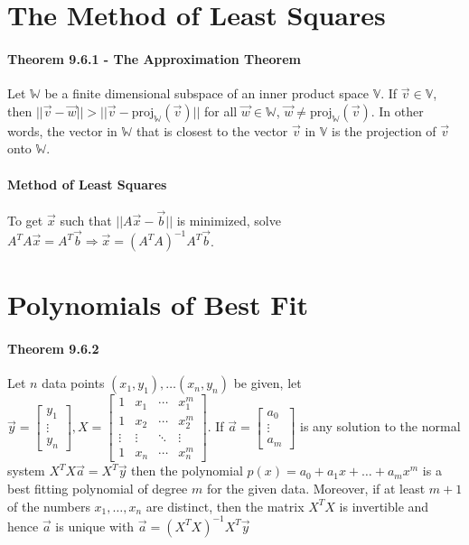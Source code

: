 \documentclass[10pt,letter]{article}
\begin{document}
\section*{The Method of Least Squares}
\paragraph{Theorem 9.6.1 - The Approximation Theorem}
Let $\mathbb{W}$ be a finite dimensional subspace of an inner product space $\mathbb{V}$. If $\vec{v}\in\mathbb{V}$, then $||\vec{v}-\vec{w}||>||\vec{v}-\text{proj}_\mathbb{W}(\vec{v})||$ for all $\vec{w}\in\mathbb{W}$, $\vec{w}\neq\text{proj}_\mathbb{W}(\vec{v})$. In other words, the vector in $\mathbb{W}$ that is closest to the vector $\vec{v}$ in $\mathbb{V}$ is the projection of $\vec{v}$ onto $\mathbb{W}$. 

\paragraph{Method of Least Squares}
To get $\vec{x}$ such that $||A\vec{x}-\vec{b}||$ is minimized, solve $A^TA\vec{x}=A^T\vec{b}\Rightarrow\vec{x}=(A^TA)^{-1}A^T\vec{b}$. 

\section*{Polynomials of Best Fit}
\paragraph{Theorem 9.6.2}
Let $n$ data points $(x_1,y_1),\ldots(x_n,y_n)$ be given, let $\vec{y}=\begin{bmatrix}y_1\\\vdots\\y_n\end{bmatrix}, X=\begin{bmatrix}1&x_1&\cdots&x_1^m\\1&x_2&\cdots&x_2^m\\\vdots&\vdots&\ddots&\vdots\\1&x_n&\cdots&x_n^m\end{bmatrix}$. If $\vec{a}=\begin{bmatrix}a_0\\\vdots\\a_m\end{bmatrix}$ is any solution to the normal system $X^TX\vec{a}=X^T\vec{y}$ then the polynomial $p(x)=a_0+a_1x+\ldots+a_mx^m$ is a best fitting polynomial of degree $m$ for the given data. Moreover, if at least $m+1$ of the numbers $x_1,\ldots,x_n$ are distinct, then the matrix $X^TX$ is invertible and hence $\vec{a}$ is unique with $\vec{a}=(X^TX)^{-1}X^T\vec{y}$
\end{document}
